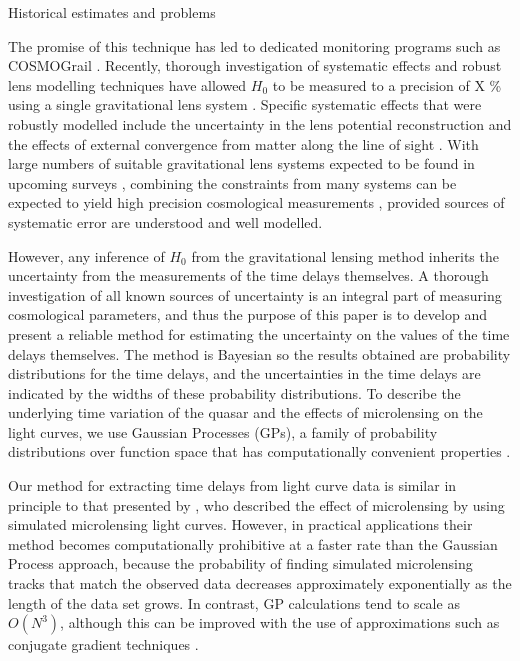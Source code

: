 \documentclass[useAMS,usenatbib, a4paper]{mn2e} \usepackage{natbib}
\begin{document}
Historical estimates and problems

The promise of this technique has led to dedicated monitoring programs such as
COSMOGrail \citep[][]{2005A&A...436...25E, 2008A&A...488..481V}. Recently,
thorough investigation of systematic effects and robust lens modelling
techniques have allowed $H_0$ to be measured to a precision of X \% using a
single gravitational lens system \citep{2010ApJ...711..201S}. Specific
systematic effects that were robustly modelled include the uncertainty in the
lens potential reconstruction \citep{2009ApJ...691..277S} and the effects of
external convergence from matter along the line of sight
\citep{2006ApJ...642...30F, 2010ApJ...711..201S}. With large numbers of
suitable gravitational lens systems expected to be found in upcoming surveys
\citep{2010MNRAS.405.2579O}, combining the constraints from many systems can
be expected to yield high precision cosmological measurements
\citep{2010ApJ...712.1378P}, provided sources of systematic error are
understood and well modelled.

However, any inference of $H_0$ from the gravitational lensing method inherits
the uncertainty from the measurements of the time delays themselves. A
thorough investigation of all known sources of uncertainty is an integral part
of measuring cosmological parameters, and thus the purpose of this paper is to
develop and present a reliable method for estimating the uncertainty on the
values of the time delays themselves. The method is Bayesian
\citep{2004kats.book.....O} so the results obtained are probability
distributions for the time delays, and the uncertainties in the time delays
are indicated by the widths of these probability distributions. To describe
the underlying time variation of the quasar and the effects of microlensing on
the light curves, we use Gaussian Processes (GPs), a family of probability
distributions over function space that has computationally convenient
properties \citep{rasmussen}.

Our method for extracting time delays from light curve data is similar in
principle to that presented by \citet{2008ApJ...676...80M}, who described the
effect of microlensing by using simulated microlensing light curves. However,
in practical applications their method becomes computationally prohibitive at
a faster rate than the Gaussian Process approach, because the probability of
finding simulated microlensing tracks that match the observed data decreases
approximately exponentially as the length of the data set grows. In contrast,
GP calculations tend to scale as $O(N^3)$, although this can be improved with
the use of approximations such as conjugate gradient techniques
\citep{gibbsmackay}.
\end{document}
